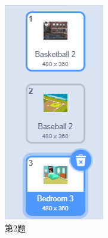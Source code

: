 \documentclass[10pt, a4paper]{article}
\begin{document}
\begin{enumerate}
\begin{figure}[htbp]
\begin{minipage}[t]{.1\textwidth}
                \includegraphics[width=\textwidth]{2.png}
                \caption*{第2题}

\end{minipage}
\end{figure}
\end{enumerate}
\end{document}
